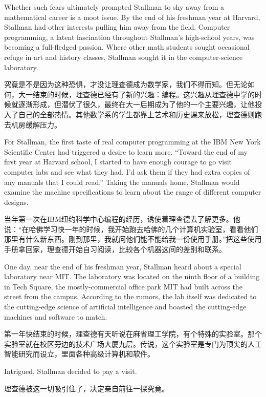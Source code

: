 \ifdefined\eng
Whether such fears ultimately prompted Stallman to shy away from a mathematical career is a moot issue. By the end of his freshman year at Harvard, Stallman had other interests pulling him away from the field. Computer programming, a latent fascination throughout Stallman's high-school years, was becoming a full-fledged passion. Where other math students sought occasional refuge in art and history classes, Stallman sought it in the computer-science laboratory.
\fi

\ifdefined\chs
究竟是不是因为这种恐惧，才没让理查德成为数学家，我们不得而知。但无论如何，大一结束的时候，理查德已经有了新的兴趣：编程。这兴趣从理查德中学的时候就逐渐形成，但潜伏了很久，最终在大一后期成为了他的一个主要兴趣，让他投入了自己的全部热情。其他数学系的学生都靠上艺术和历史课来放松，理查德则跑去机房缓解压力。
\fi

\ifdefined\eng
For Stallman, the first taste of real computer programming at the IBM New York Scientific Center had triggered a desire to learn more. ``Toward the end of my first year at Harvard school, I started to have enough courage to go visit computer labs and see what they had. I'd ask them if they had extra copies of any manuals that I could read.'' Taking the manuals home, Stallman would examine the machine specifications to learn about the range of different computer designs.
\fi

\ifdefined\chs
当年第一次在IBM纽约科学中心编程的经历，诱使着理查德去了解更多。他说：``在哈佛学习快一年的时候，我开始跑去哈佛的几个计算机实验室，看看他们那里有什么新东西。刚到那里，我就问他们能不能给我一份使用手册。''把这些使用手册拿回家，理查德开始自习阅读，比较各个机器这间的差别和联系。
\fi

\ifdefined\eng
One day, near the end of his freshman year, Stallman heard about a special laboratory near MIT. The laboratory was located on the ninth floor of a building in Tech Square, the mostly-commercial office park MIT had built across the street from the campus. According to the rumors, the lab itself was dedicated to the cutting-edge science of artificial intelligence and boasted the cutting-edge machines and software to match.
\fi

\ifdefined\chs
第一年快结束的时候，理查德有天听说在麻省理工学院，有个特殊的实验室。那个实验室就在校区旁边的技术广场大厦九层。传说，这个实验室是专门为顶尖的人工智能研究而设立，里面各种高级计算机和软件。
\fi

\ifdefined\eng
Intrigued, Stallman decided to pay a visit.
\fi

\ifdefined\chs
理查德被这一切吸引住了，决定亲自前往一探究竟。
\fi

